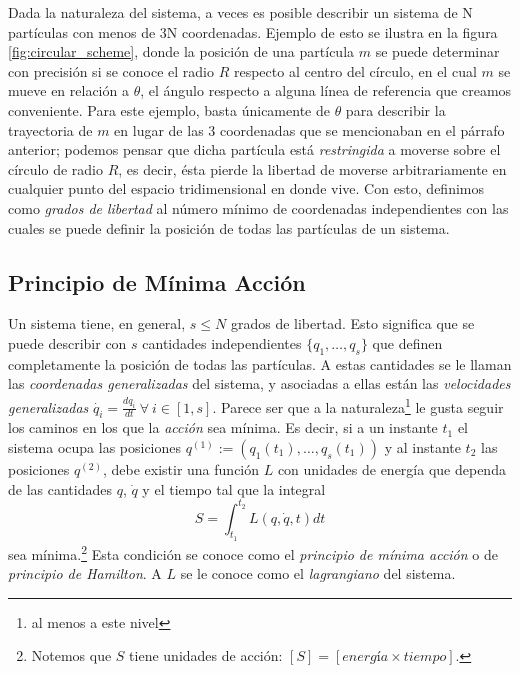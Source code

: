 

Dada la naturaleza del sistema, a veces es posible describir un sistema de N partículas con menos de 3N coordenadas. Ejemplo de esto se ilustra en la figura \ref{fig:circular_scheme}, donde la posición de una partícula $m$ se puede determinar con precisión si se conoce el radio $R$ respecto al centro del círculo, en el cual $m$ se mueve en relación a $\theta$, el ángulo respecto a alguna línea de referencia que creamos conveniente. Para este ejemplo, basta únicamente de $\theta$ para describir la trayectoria de $m$ en lugar de las 3 coordenadas que se mencionaban en el párrafo anterior; podemos pensar que dicha partícula está \textit{restringida} a moverse sobre el círculo de radio $R$, es decir, ésta pierde la libertad de moverse arbitrariamente en cualquier punto del espacio tridimensional en donde vive. Con esto, definimos como \textit{grados de libertad} al número mínimo de coordenadas independientes con las cuales se puede definir la posición de todas las partículas de un sistema. 

\subsection{Principio de Mínima Acción}
\label{sec:least_action}

Un sistema tiene, en general, $s \leq N$ grados de libertad. Esto significa que se puede describir con $s$ cantidades independientes $\lbrace q_1, \ldots, q_s \rbrace$ que definen completamente la posición de todas las partículas. A estas cantidades se le llaman las \textit{coordenadas generalizadas} del sistema, y asociadas a ellas están las \textit{velocidades generalizadas} $\dot{q_i} = \frac{dq_i}{dt} \  \forall \ i \in [1,s]$. Parece ser que a la naturaleza\footnote{al menos a este nivel} le gusta seguir los caminos en los que la \textit{acción} sea mínima. Es decir, si a un instante $t_1$ el sistema ocupa las posiciones $q^{(1)} := (q_1(t_1), \ldots, q_s(t_1))$ y al instante $t_2$ las posiciones $q^{(2)}$,  debe existir una función $L$ con unidades de energía que dependa de las cantidades $q$, $\dot{q}$ y el tiempo tal que la integral 
\begin{equation}
 S = \int_{t_1}^{t_2} L(q,\dot{q},t) dt
 \label{eq:action}
\end{equation}
sea mínima.\footnote{Notemos que $S$ tiene unidades de acción: $[ S ] = [energía \times tiempo]$.} Esta condición se conoce como el \textit{principio de mínima acción} o de \textit{principio de Hamilton}. A $L$ se le conoce como el \textit{lagrangiano} del sistema.

